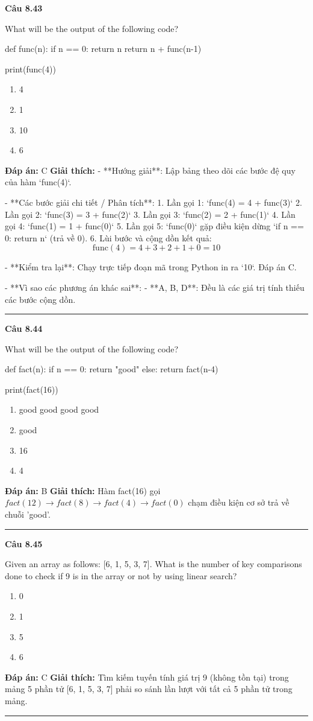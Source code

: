\documentclass[11pt,a4paper]{article}
\newenvironment{question}[1]{%
  \par\vspace{1em}\noindent\textbf{\large Câu #1}\par\vspace{0.4em}
}{%
  \par\vspace{1em}\hrule\vspace{0.6em}
}
\newenvironment{choices}{%
  \begin{enumerate}[label=\textbf{\Alph*.},leftmargin=2.2em,itemsep=2pt,topsep=3pt]
}{%
  \end{enumerate}
}
\newcommand{\choice}{\item}
\newenvironment{codebox}{%
  \begin{tcolorbox}[colback=gray!8!white,colframe=gray!50!black,arc=1.5mm,boxrule=0.6pt,left=3mm,right=3mm,top=2.5mm,bottom=2.5mm]
  \ttfamily\small
}{%
  \end{tcolorbox}
}
\begin{document}
\begin{question}{8.43}
What will be the output of the following code?
\begin{codebox}
def func(n):
    if n == 0:
        return n
    return n + func(n-1)

print(func(4))
\end{codebox}
\begin{choices}
\choice 4
\choice 1
\choice 10
\choice 6
\end{choices}
\textbf{Đáp án:} C
\textbf{Giải thích:} - **Hướng giải**:
  Lập bảng theo dõi các bước đệ quy của hàm `func(4)`.

- **Các bước giải chi tiết / Phân tích**:
  1. Lần gọi 1: `func(4) = 4 + func(3)`
  2. Lần gọi 2: `func(3) = 3 + func(2)`
  3. Lần gọi 3: `func(2) = 2 + func(1)`
  4. Lần gọi 4: `func(1) = 1 + func(0)`
  5. Lần gọi 5: `func(0)` gặp điều kiện dừng `if n == 0: return n` (trả về 0).
  6. Lùi bước và cộng dồn kết quả:
     \[
     \text{func}(4) = 4 + 3 + 2 + 1 + 0 = 10
     \]

- **Kiểm tra lại**:
  Chạy trực tiếp đoạn mã trong Python in ra `10`. Đáp án C.

- **Vì sao các phương án khác sai**:
  - **A, B, D**: Đều là các giá trị tính thiếu các bước cộng dồn.
\end{question}

\begin{question}{8.44}
What will be the output of the following code?
\begin{codebox}
def fact(n):
    if n == 0:
        return "good"
    else:
        return fact(n-4)

print(fact(16))
\end{codebox}
\begin{choices}
\choice good good good good
\choice good
\choice 16
\choice 4
\end{choices}
\textbf{Đáp án:} B
\textbf{Giải thích:} Hàm fact(16) gọi \(fact(12) \to fact(8) \to fact(4) \to fact(0)\) chạm điều kiện cơ sở trả về chuỗi 'good'.
\end{question}

\begin{question}{8.45}
Given an array as follows: [6, 1, 5, 3, 7]. What is the number of key comparisons done to check if 9 is in the array or not by using linear search?
\begin{choices}
\choice 0
\choice 1
\choice 5
\choice 6
\end{choices}
\textbf{Đáp án:} C
\textbf{Giải thích:} Tìm kiếm tuyến tính giá trị 9 (không tồn tại) trong mảng 5 phần tử [6, 1, 5, 3, 7] phải so sánh lần lượt với tất cả 5 phần tử trong mảng.
\end{question}
\end{document}
